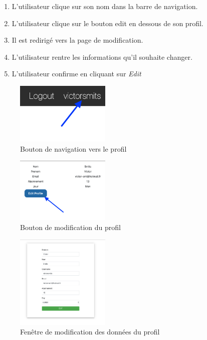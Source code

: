 \begin{enumerate}
	\item L'utilisateur clique sur son nom dans la barre de navigation.
	\item L'utilisateur clique sur le bouton edit en dessous de son profil. 
	\item Il est redirigé vers la page de modification. 
	\item L'utilisateur rentre les informations qu'il souhaite changer. 
	\item L'utilisateur confirme en cliquant sur \textit{Edit}
\end{enumerate}

\vspace{\baselineskip}
\begin{figure}[h]
	\includegraphics[width=0.4\textwidth,center]{Figures/us7-1}
	\caption{Bouton de navigation vers le profil}
\end{figure}

\vspace{\baselineskip}
\begin{figure}[h]
	\includegraphics[width=0.4\textwidth,center]{Figures/us8-1}
	\caption{Bouton de modification du profil}
\end{figure}

\newpage
\begin{figure}[h]
	\includegraphics[width=0.4\textwidth,center]{Figures/us8-2}
	\caption{Fenêtre de modification des données du profil}
\end{figure}

